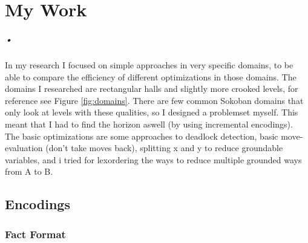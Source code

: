 \documentclass{report}
\begin{document}
\chapter{My Work}
\paragraph*{•}
In my research I focused on simple approaches in very specific domains, to be able to compare the efficiency of different optimizations in those domains. The domains I researched are rectangular halls and slightly more crooked levels, for reference see Figure \ref{fig:domains}. There are few common Sokoban domains that only look at levels with these qualities, so I designed a problemset myself. This meant that I had to find the horizon aswell (by using incremental encodings). The basic optimizations are some approaches to deadlock detection, basic move-evaluation (don't take moves back), splitting x and y to reduce groundable variables, and i tried for lexordering the ways to reduce multiple grounded ways from A to B.
\section{Encodings}
\subsection{Fact Format}
\end{document}
